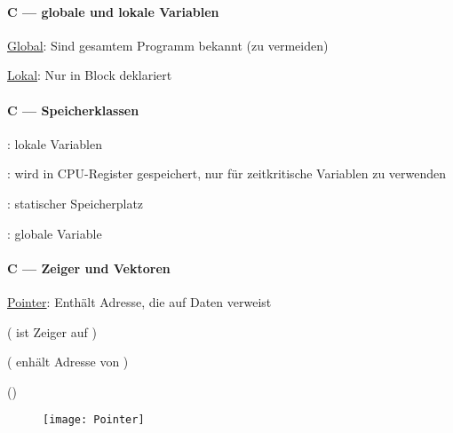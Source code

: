 \paragraph{C --- globale und lokale Variablen}
\begin{items}
  \item \underline{Global}: Sind gesamtem Programm bekannt (zu vermeiden)
  \item \underline{Lokal}: Nur in Block deklariert
\end{items}

\paragraph{C --- Speicherklassen}
\begin{items}
  \item \underline{}: lokale Variablen
  \item \underline{}: wird in CPU-Register gespeichert, nur für zeitkritische Variablen zu verwenden
  \item \underline{}: statischer Speicherplatz
  \item \underline{}: globale Variable
\end{items}

\paragraph{C --- Zeiger und Vektoren}
\begin{items}
  \item \underline{Pointer}: Enthält Adresse, die auf Daten verweist
  \item {} ( ist Zeiger auf )
  \item {} ( enhält Adresse von )
  \item {} ()
\end{items}
\begin{figure}[H]
  \centering
  \texttt{[image: Pointer]}
\label{Pointer}
\end{figure}